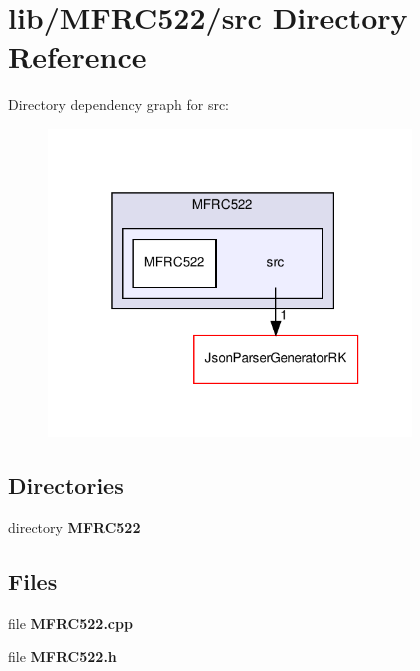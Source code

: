 \section{lib/\+M\+F\+R\+C522/src Directory Reference}
\label{dir_a6a85200a0d867b4aa73915ee03329b1}
Directory dependency graph for src\+:\nopagebreak
\begin{figure}[H]
\begin{center}
\leavevmode
\includegraphics[width=273pt]{dir_a6a85200a0d867b4aa73915ee03329b1_dep}
\end{center}
\end{figure}
\subsection*{Directories}
\begin{DoxyCompactItemize}
\item 
directory \textbf{ M\+F\+R\+C522}
\end{DoxyCompactItemize}
\subsection*{Files}
\begin{DoxyCompactItemize}
\item 
file \textbf{ M\+F\+R\+C522.\+cpp}
\item 
file \textbf{ M\+F\+R\+C522.\+h}
\end{DoxyCompactItemize}

